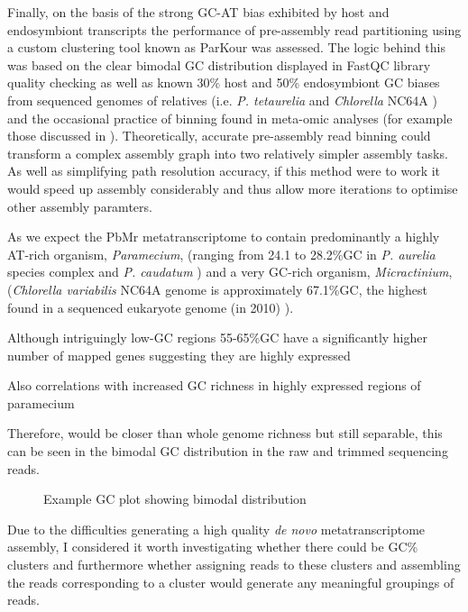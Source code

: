 Finally, on the basis of the strong GC-AT bias exhibited by host and endosymbiont transcripts
the performance of pre-assembly read partitioning using a custom clustering tool known as
ParKour was assessed.  The logic behind this was based on the clear bimodal GC distribution
displayed in FastQC library quality checking as well as known 30\% host and 50\% endosymbiont
GC biases from sequenced genomes of relatives (i.e. \textit{P. tetaurelia} \citep{Aury2006} and 
\textit{Chlorella} NC64A \citep{Blanc2010a}) and the occasional practice of binning found in
meta-omic analyses (for example those discussed in \citep{Droge2012}).  Theoretically, accurate
pre-assembly read binning could transform a complex assembly graph into two relatively simpler
assembly tasks.  As well as simplifying path resolution accuracy, if this method were to work
it would speed up assembly considerably and thus allow more iterations to optimise other
assembly paramters.

As we expect the PbMr metatranscriptome to contain predominantly a highly AT-rich organism, \textit{Paramecium},
(ranging from 24.1 to 28.2\%GC in \textit{P. aurelia} species complex and \textit{P. caudatum} \citep{Aury2006,McGrath2014})
and a very GC-rich organism, \textit{Micractinium}, (\textit{Chlorella variabilis} NC64A genome is approximately 67.1\%GC, the highest
found in a sequenced eukaryote genome (in 2010) \citep{Blanc2010}).  



Although intriguingly low-GC regions 55-65\%GC have a significantly higher number of mapped genes suggesting they are highly expressed \citep{Blanc2010}

Also correlations with increased GC richness in highly expressed regions of paramecium

Therefore,  would be closer than whole genome richness but still separable, this can be seen in the bimodal GC distribution in the raw and trimmed sequencing 
reads.

\begin{figure}
    Example GC plot showing bimodal distribution
\end{figure}

Due to the difficulties generating a high quality \textit{de novo} metatranscriptome assembly, I considered  it worth investigating whether there could be GC\%
clusters and furthermore whether assigning reads to these clusters and assembling the reads corresponding to a cluster would generate any meaningful groupings of reads.

